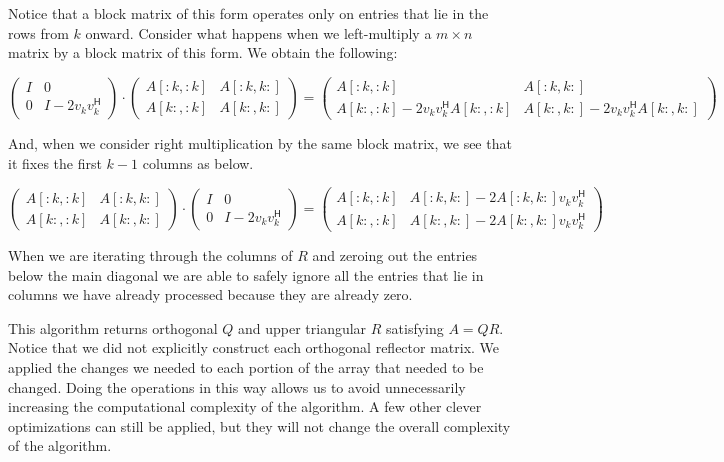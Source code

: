 Notice that a block matrix of this form operates only on entries that lie in the rows from $k$ onward.
Consider what happens when we left-multiply a $m \times n$ matrix by a block matrix of this form.
We obtain the following:

\[
\begin{pmatrix}
I & 0 \\
0 & I - 2 v_k v_k^\mathsf{H}
\end{pmatrix}
\cdot
\begin{pmatrix}
A[:k,:k] & A[:k,k:] \\
A[k:,:k] & A[k:,k:]
\end{pmatrix}
=
\begin{pmatrix}
A[:k,:k] & A[:k,k:] \\
A[k:,:k] - 2 v_k v_k^\mathsf{H} A[k:,:k] & A[k:,k:] - 2 v_k v_k^\mathsf{H} A[k:,k:]
\end{pmatrix}
\]

And, when we consider right multiplication by the same block matrix, we see that it fixes the first $k-1$ columns as below.

\[
\begin{pmatrix}
A[:k,:k] & A[:k,k:] \\
A[k:,:k] & A[k:,k:]
\end{pmatrix}
\cdot
\begin{pmatrix}
I & 0 \\
0 & I - 2 v_k v_k^\mathsf{H}
\end{pmatrix}
=
\begin{pmatrix}
A[:k,:k] & A[:k,k:] - 2  A[:k,k:] v_k v_k^\mathsf{H} \\
A[k:,:k] & A[k:,k:] - 2 A[k:,k:] v_k v_k^\mathsf{H}
\end{pmatrix}
\]

When we are iterating through the columns of $R$ and zeroing out the entries below the main diagonal we are able to safely ignore all the entries that lie in columns we have already processed because they are already zero.

This algorithm returns orthogonal $Q$ and upper triangular $R$ satisfying $A = QR$.
Notice that we did not explicitly construct each orthogonal reflector matrix.
We applied the changes we needed to each portion of the array that needed to be changed.
Doing the operations in this way allows us to avoid unnecessarily increasing the computational complexity of the algorithm.
A few other clever optimizations can still be applied, but they will not change the overall complexity of the algorithm.

